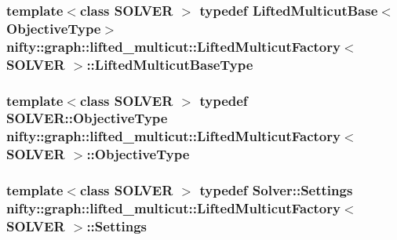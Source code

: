\subsubsection[{Lifted\+Multicut\+Base\+Type}]{\setlength{\rightskip}{0pt plus 5cm}template$<$class S\+O\+L\+V\+E\+R $>$ typedef {\bf Lifted\+Multicut\+Base}$<${\bf Objective\+Type}$>$ {\bf nifty\+::graph\+::lifted\+\_\+multicut\+::\+Lifted\+Multicut\+Factory}$<$ S\+O\+L\+V\+E\+R $>$\+::{\bf Lifted\+Multicut\+Base\+Type}}\label{classnifty_1_1graph_1_1lifted__multicut_1_1LiftedMulticutFactory_aa56d6140f798ec6bdf510ac80ddb7a0b}
\hypertarget{classnifty_1_1graph_1_1lifted__multicut_1_1LiftedMulticutFactory_aa8756716f99f691a6cff57d58bb71dd4}{}
\subsubsection[{Objective\+Type}]{\setlength{\rightskip}{0pt plus 5cm}template$<$class S\+O\+L\+V\+E\+R $>$ typedef S\+O\+L\+V\+E\+R\+::\+Objective\+Type {\bf nifty\+::graph\+::lifted\+\_\+multicut\+::\+Lifted\+Multicut\+Factory}$<$ S\+O\+L\+V\+E\+R $>$\+::{\bf Objective\+Type}}\label{classnifty_1_1graph_1_1lifted__multicut_1_1LiftedMulticutFactory_aa8756716f99f691a6cff57d58bb71dd4}
\hypertarget{classnifty_1_1graph_1_1lifted__multicut_1_1LiftedMulticutFactory_a48e27ca10f95291da7b3a345c255ab6f}{}
\subsubsection[{Settings}]{\setlength{\rightskip}{0pt plus 5cm}template$<$class S\+O\+L\+V\+E\+R $>$ typedef Solver\+::\+Settings {\bf nifty\+::graph\+::lifted\+\_\+multicut\+::\+Lifted\+Multicut\+Factory}$<$ S\+O\+L\+V\+E\+R $>$\+::{\bf Settings}}\label{classnifty_1_1graph_1_1lifted__multicut_1_1LiftedMulticutFactory_a48e27ca10f95291da7b3a345c255ab6f}
\hypertarget{classnifty_1_1graph_1_1lifted__multicut_1_1LiftedMulticutFactory_a06c07c55aa3f5d550e0f48bb4b476b3c}{}
